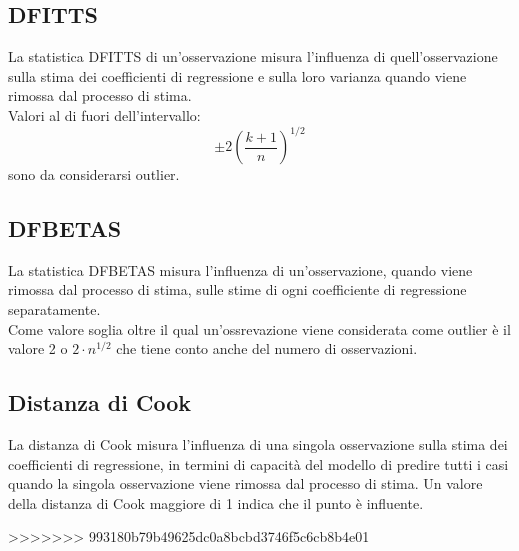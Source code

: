 \subsection{DFITTS}
La statistica DFITTS di un'osservazione misura l’influenza di quell'osservazione sulla stima dei coefficienti di regressione e sulla loro varianza quando viene rimossa dal processo di stima.\\
Valori al di fuori dell'intervallo:
\begin{equation}
\pm 2 (\frac{k+1}{n})^{1/2} 
\end{equation}
sono da considerarsi outlier.
\subsection{DFBETAS}
La statistica DFBETAS misura l’influenza di un'osservazione, quando viene rimossa dal processo di stima, sulle stime di ogni coefficiente di regressione separatamente.\\
Come valore soglia oltre il qual un'ossrevazione viene considerata come outlier è il valore 2 o $2 \cdot n^{1/2}$ che tiene conto anche del numero di osservazioni.

\subsection{Distanza di Cook}
La distanza di Cook misura l’influenza di una singola osservazione sulla stima dei coefficienti di regressione, in termini di capacità del modello di predire tutti i casi quando la singola osservazione viene rimossa dal processo di stima. Un valore della distanza di Cook maggiore di 1 indica che il punto è influente.


>>>>>>> 993180b79b49625dc0a8bcbd3746f5c6cb8b4e01
